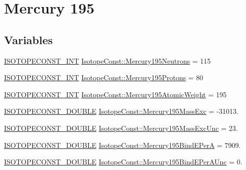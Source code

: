 \hypertarget{group___isotope_const-_mercury-_hg195}{}\section{Mercury 195}
\label{group___isotope_const-_mercury-_hg195}
\subsection*{Variables}
\begin{DoxyCompactItemize}
\item 
\mbox{\hyperlink{group___isotope_const-_macros_ga5f18360b3e99483a35c32d789e62621c}{I\+S\+O\+T\+O\+P\+E\+C\+O\+N\+S\+T\+\_\+\+I\+NT}} \mbox{\hyperlink{group___isotope_const-_mercury-_hg195_ga239f35eac7060ee658daa72f97e49d4f}{Isotope\+Const\+::\+Mercury195\+Neutrons}} = 115
\item 
\mbox{\hyperlink{group___isotope_const-_macros_ga5f18360b3e99483a35c32d789e62621c}{I\+S\+O\+T\+O\+P\+E\+C\+O\+N\+S\+T\+\_\+\+I\+NT}} \mbox{\hyperlink{group___isotope_const-_mercury-_hg195_ga82b4eec611474d93c7822bc591e0ddad}{Isotope\+Const\+::\+Mercury195\+Protons}} = 80
\item 
\mbox{\hyperlink{group___isotope_const-_macros_ga5f18360b3e99483a35c32d789e62621c}{I\+S\+O\+T\+O\+P\+E\+C\+O\+N\+S\+T\+\_\+\+I\+NT}} \mbox{\hyperlink{group___isotope_const-_mercury-_hg195_ga7f76500f8556338650de80630d381737}{Isotope\+Const\+::\+Mercury195\+Atomic\+Weight}} = 195
\item 
\mbox{\hyperlink{group___isotope_const-_macros_ga8f45a7272ce02c0b4c65c44636ed719a}{I\+S\+O\+T\+O\+P\+E\+C\+O\+N\+S\+T\+\_\+\+D\+O\+U\+B\+LE}} \mbox{\hyperlink{group___isotope_const-_mercury-_hg195_ga0a52d83fa8ae100fafc4d771e535aaa8}{Isotope\+Const\+::\+Mercury195\+Mass\+Exc}} = -\/31013.
\item 
\mbox{\hyperlink{group___isotope_const-_macros_ga8f45a7272ce02c0b4c65c44636ed719a}{I\+S\+O\+T\+O\+P\+E\+C\+O\+N\+S\+T\+\_\+\+D\+O\+U\+B\+LE}} \mbox{\hyperlink{group___isotope_const-_mercury-_hg195_ga408253d2e428d26de0f3148e1720428a}{Isotope\+Const\+::\+Mercury195\+Mass\+Exc\+Unc}} = 23.
\item 
\mbox{\hyperlink{group___isotope_const-_macros_ga8f45a7272ce02c0b4c65c44636ed719a}{I\+S\+O\+T\+O\+P\+E\+C\+O\+N\+S\+T\+\_\+\+D\+O\+U\+B\+LE}} \mbox{\hyperlink{group___isotope_const-_mercury-_hg195_ga35f8cbe6f8c52e2ff7ea9680227ac3f7}{Isotope\+Const\+::\+Mercury195\+Bind\+E\+PerA}} = 7909.
\item 
\mbox{\hyperlink{group___isotope_const-_macros_ga8f45a7272ce02c0b4c65c44636ed719a}{I\+S\+O\+T\+O\+P\+E\+C\+O\+N\+S\+T\+\_\+\+D\+O\+U\+B\+LE}} \mbox{\hyperlink{group___isotope_const-_mercury-_hg195_ga58ff4982d36a7af78138fa138e42ce85}{Isotope\+Const\+::\+Mercury195\+Bind\+E\+Per\+A\+Unc}} = 0.

\end{DoxyCompactItemize}

